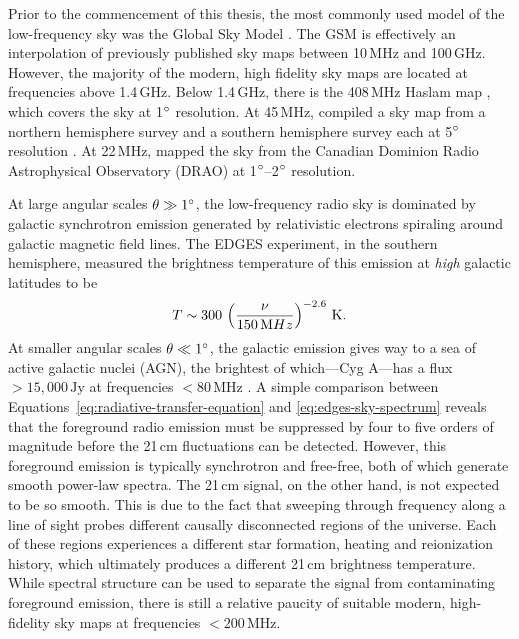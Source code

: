 \begin{bibunit}
Prior to the commencement of this thesis, the most commonly used model of the low-frequency sky was
the Global Sky Model \citep[GSM;][]{2008MNRAS.388..247D}. The GSM is effectively an interpolation of
previously published sky maps between 10\,MHz and 100\,GHz. However, the majority of the modern,
high fidelity sky maps are located at frequencies above 1.4\,GHz. Below 1.4\,GHz, there is the
408\,MHz Haslam map \citep{1981A&A...100..209H,1982A&AS...47....1H}, which covers the sky at
1$\arcdeg$ resolution. At 45\,MHz, \citet{2011A&A...525A.138G} compiled a sky map from a northern
hemisphere survey and a southern hemisphere survey each at 5$\arcdeg$ resolution
\citep{1997A&AS..124..315A, 1999A&AS..140..145M}. At 22\,MHz, \citet{1999A&AS..137....7R} mapped the
sky from the Canadian Dominion Radio Astrophysical Observatory (DRAO) at 1$\arcdeg$--2$\arcdeg$
resolution.

At large angular scales $\theta \gg 1\arcdeg$, the low-frequency radio sky is dominated by galactic
synchrotron emission generated by relativistic electrons spiraling around galactic magnetic field
lines. The EDGES experiment, in the southern hemisphere, measured the brightness temperature of this
emission at \emph{high} galactic latitudes to be \citep{2017MNRAS.464.4995M}
\begin{equation}\label{eq:edges-sky-spectrum}
    T \sim 300\,\left(\frac{\nu}{150\,{\rm MHz}}\right)^{-2.6}\,\text{K}.
\end{equation}
At smaller angular scales $\theta \ll 1\arcdeg$, the galactic emission gives way to a sea of active
galactic nuclei (AGN), the brightest of which---Cyg A---has a flux $>15,000\,\text{Jy}$ at frequencies
$<80\,\text{MHz}$ \citep{1977A&A....61...99B}. A simple comparison between
Equations~\ref{eq:radiative-transfer-equation} and \ref{eq:edges-sky-spectrum} reveals that the
foreground radio emission must be suppressed by four to five orders of magnitude before the 21\,cm
fluctuations can be detected.  However, this foreground emission is typically synchrotron and
free-free, both of which generate smooth power-law spectra. The 21\,cm signal, on the other hand, is
not expected to be so smooth. This is due to the fact that sweeping through frequency along a line
of sight probes different causally disconnected regions of the universe. Each of these regions
experiences a different star formation, heating and reionization history, which ultimately produces
a different 21\,cm brightness temperature.  While spectral structure can be used to separate the
signal from contaminating foreground emission, there is still a relative paucity of suitable modern,
high-fidelity sky maps at frequencies $<200\,\text{MHz}$.


\end{bibunit}
